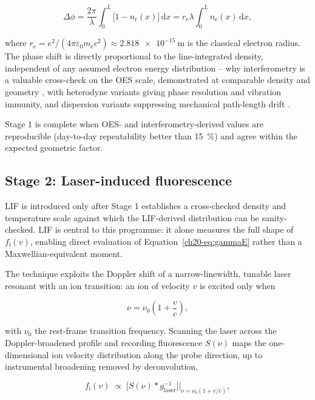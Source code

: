 \begin{equation}
\Delta \phi = \frac{2\pi}{\lambda} \int_{0}^{L} \bigl[1 - n_{\mathrm{r}}(x)\bigr] \, \mathrm{d}x = r_{\mathrm{e}} \lambda \int_{0}^{L} n_{\mathrm{e}}(x) \, \mathrm{d}x,
\label{ch20-eq:interferometry}
\end{equation}

where $r_{\mathrm{e}} = e^{2}/(4\pi\varepsilon_{0} m_{\mathrm{e}} c^{2}) \approx \SI{2.818e-15}{\meter}$ is the classical electron radius. The phase shift is directly proportional to the line-integrated density, independent of any assumed electron energy distribution -- why interferometry is a valuable cross-check on the OES scale, demonstrated at comparable density and geometry \cite{ref0400}, with heterodyne variants giving phase resolution and vibration immunity, and dispersion variants suppressing mechanical path-length drift \cite{ref0417}.

Stage 1 is complete when OES- and interferometry-derived values are reproducible (day-to-day repeatability better than \SI{15}{\percent}) and agree within the expected geometric factor.

\subsection{Stage 2: Laser-induced fluorescence}

LIF is introduced only after Stage 1 establishes a cross-checked density and temperature scale against which the LIF-derived distribution can be sanity-checked. LIF is central to this programme: it alone measures the full shape of $f_{\mathrm{i}}(v)$, enabling direct evaluation of Equation~\eqref{ch20-eq:gammaE} rather than a Maxwellian-equivalent moment.

The technique exploits the Doppler shift of a narrow-linewidth, tunable laser resonant with an ion transition: an ion of velocity $v$ is excited only when

\begin{equation}
\nu = \nu_{0} \left( 1 + \frac{v}{c} \right),
\label{eq:doppler}
\end{equation}

with $\nu_{0}$ the rest-frame transition frequency. Scanning the laser across the Doppler-broadened profile and recording fluorescence $S(\nu)$ maps the one-dimensional ion velocity distribution along the probe direction, up to instrumental broadening removed by deconvolution,

\begin{equation}
f_{\mathrm{i}}(v) \; \propto \; \bigl[ S(\nu) \ast g_{\mathrm{laser}}^{-1} \bigr] \Big|_{\nu = \nu_{0}(1+v/c)},
\label{eq:lif-inversion}
\end{equation}


